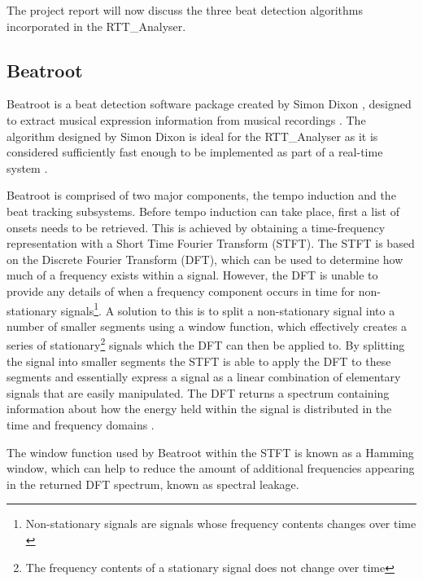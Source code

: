 \documentclass[a4paper, 11pt]{article}
\begin{document}
The project report will now discuss the three beat detection algorithms incorporated in the RTT\_Analyser.

\subsection{Beatroot}
Beatroot is a beat detection software package created by Simon Dixon \cite{dixon1}, designed to extract musical expression information from musical recordings \cite{dixon3}. The algorithm designed by Simon Dixon is ideal for the RTT\_Analyser as it is considered sufficiently fast enough to be implemented as part of a real-time system \cite{dixon4}.\par

Beatroot is comprised of two major components, the tempo induction and the beat tracking subsystems. Before tempo induction can take place, first a list of onsets needs to be retrieved\cite{dixon4}. This is achieved by obtaining a time-frequency representation with a Short Time Fourier Transform (STFT). The STFT is based on the Discrete Fourier Transform (DFT), which can be used to determine how much of a frequency exists within a signal. However, the DFT is unable to provide any details of when a frequency component occurs in time for non-stationary signals\footnote{Non-stationary signals are signals whose frequency contents changes over time \cite{polikapt2}}. A solution to this is to split a non-stationary signal into a number of smaller segments using a window function, which effectively creates a series of stationary\footnote{The frequency contents of a stationary signal does not change over time} signals which the DFT can then be applied to. By splitting the signal into smaller segments the STFT is able to apply the DFT to these segments and essentially express a signal as a linear combination of elementary signals that are easily manipulated. The DFT returns a spectrum containing information about how the energy held within the signal is distributed in the time and frequency domains \cite{tzane2}.\par

The window function used by Beatroot within the STFT is known as a Hamming window, which can help to reduce the amount of additional frequencies appearing in the returned DFT spectrum, known as spectral leakage. 

\end{document}
